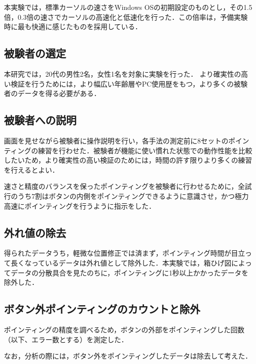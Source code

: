 \documentclass[a4paper, papersize, titlepage]{jsarticle}
\begin{document}
\begin{multicols}{2}
本実験では，標準カーソルの速さをWindows OSの初期設定のものとし，その1.5倍，0.3倍の速さでカーソルの高速化と低速化を行った．この倍率は，予備実験時に最も快適に感じたものを採用している．


\subsection{被験者の選定}
本研究では，20代の男性2名，女性1名を対象に実験を行った．
より確実性の高い検証を行うためには，より幅広い年齢層やPC使用歴をもつ，より多くの被験者のデータを得る必要がある．


\subsection{被験者への説明}
画面を見せながら被験者に操作説明を行い，各手法の測定前に8セットのポインティングの練習を行わせた．被験者が機能に使い慣れた状態での動作性能を比較したいため，より確実性の高い検証のためには，時間の許す限りより多くの練習を行えるとよい．

速さと精度のバランスを保ったポインティングを被験者に行わせるために，全試行のうち7割はボタンの内側をポインティングできるように意識させ，かつ極力高速にポインティングを行うように指示をした．


\subsection{外れ値の除去}
得られたデータうち，軽微な位置修正では済まず，ポインティング時間が目立って長くなっているデータは外れ値として除外した．本実験では，箱ひげ図によってデータの分散具合を見たのちに，ポインティングに1秒以上かかったデータを除外した．


\subsection{ボタン外ポインティングのカウントと除外}
ポインティングの精度を調べるため，ボタンの外部をポインティングした回数（以下、エラー数とする）を測定した．

なお，分析の際には，ボタン外をポインティングしたデータは除去して考えた．




\end{multicols}
\end{document}
